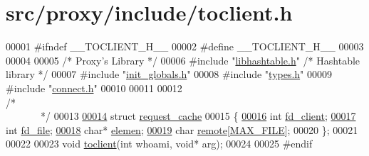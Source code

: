 \hypertarget{toclient_8h_source}{
\section{src/proxy/include/toclient.h}
}

\begin{DoxyCode}
00001 \textcolor{preprocessor}{#ifndef \_\_TOCLIENT\_H\_\_}
00002 \textcolor{preprocessor}{}\textcolor{preprocessor}{#define \_\_TOCLIENT\_H\_\_}
00003 \textcolor{preprocessor}{}
00004 
00005 \textcolor{comment}{/*      Proxy's Library */}
00006 \textcolor{preprocessor}{#include        "\hyperlink{proxy_2include_2libhashtable_8h}{libhashtable.h}"}        \textcolor{comment}{/*      Hashtable library       */}
00007 \textcolor{preprocessor}{#include        "\hyperlink{init__globals_8h}{init_globals.h}"}
00008 \textcolor{preprocessor}{#include        "\hyperlink{types_8h}{types.h}"}
00009 \textcolor{preprocessor}{#include        "\hyperlink{connect_8h}{connect.h}"}
00010 
00011 
00012 \textcolor{comment}{/*~~~~~~~~~~~~~~~~~~~~~~~~~~~~~~~~~~~~~~~~~~~~~~~~~~~~~~~~~~~~~~~~~~~~~~~~~~~~~*/
      }
00013 
\hypertarget{toclient_8h_source_l00014}{}\hyperlink{structrequest__cache}{00014} \textcolor{keyword}{struct }\hyperlink{structrequest__cache}{request_cache}
00015 \{
\hypertarget{toclient_8h_source_l00016}{}\hyperlink{structrequest__cache_ab27cbab9f719741ae489f4430e7da682}{00016}         \textcolor{keywordtype}{int}             \hyperlink{structrequest__cache_ab27cbab9f719741ae489f4430e7da682}{fd_client};
\hypertarget{toclient_8h_source_l00017}{}\hyperlink{structrequest__cache_aaf09572743c4a2b54d890e4b84a29e8b}{00017}         \textcolor{keywordtype}{int}             \hyperlink{structrequest__cache_aaf09572743c4a2b54d890e4b84a29e8b}{fd_file};
\hypertarget{toclient_8h_source_l00018}{}\hyperlink{structrequest__cache_a59234fac7de2e701b706493c82ca1dcc}{00018}         \textcolor{keywordtype}{char}*   \hyperlink{structrequest__cache_a59234fac7de2e701b706493c82ca1dcc}{elemen};
\hypertarget{toclient_8h_source_l00019}{}\hyperlink{structrequest__cache_a7fe39e9d4981bcb775ecf23bb7197271}{00019}         \textcolor{keywordtype}{char}    \hyperlink{structrequest__cache_a7fe39e9d4981bcb775ecf23bb7197271}{remote}[\hyperlink{hashtable_2include_2consts_8h_a19d34ae55fb2e29df830c11df2219da8}{MAX_FILE}];
00020 \};
00021 
00022 
00023 \textcolor{keywordtype}{void}    \hyperlink{toclient_8h_a8d982cea0e5c6a09828204e8d93edad0}{toclient}(\textcolor{keywordtype}{int} whoami, \textcolor{keywordtype}{void}* arg);
00024 
00025 \textcolor{preprocessor}{#endif}
\end{DoxyCode}
